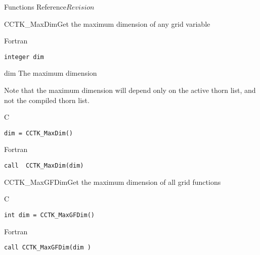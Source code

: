 \begin{cactuspart}{ Functions Reference}{}{$Revision$}
\begin{FunctionDescription}{CCTK\_MaxDim}{Get the maximum dimension of any grid variable }
\begin{SynopsisSection}
\begin{Synopsis}{Fortran}
\begin{verbatim}
integer dim\end{verbatim}
\end{Synopsis}
\end{SynopsisSection}
\begin{ParameterSection}
\begin{Parameter}{dim}
The maximum dimension
\end{Parameter}
\end{ParameterSection}
\begin{Discussion}
Note that the maximum dimension will depend only on the active thorn list,
and not the compiled thorn list.
\end{Discussion}
\begin{ExampleSection}
\begin{Example}{C}
\begin{verbatim}
dim = CCTK_MaxDim()
\end{verbatim}
\end{Example}
\begin{Example}{Fortran}
\begin{verbatim}
call  CCTK_MaxDim(dim)
\end{verbatim}
\end{Example}
\end{ExampleSection}
\end{FunctionDescription}


\begin{FunctionDescription}{CCTK\_MaxGFDim}{Get the maximum dimension of all grid
    functions }
\label{CCTK-MaxGFDim}
\begin{SynopsisSection}
\begin{Synopsis}{C}
\begin{verbatim}int dim = CCTK_MaxGFDim()\end{verbatim}
\end{Synopsis}
\begin{Synopsis}{Fortran}
\begin{verbatim}call CCTK_MaxGFDim(dim )


\end{verbatim}
\end{Synopsis}
\end{SynopsisSection}
\end{FunctionDescription}
\end{cactuspart}
